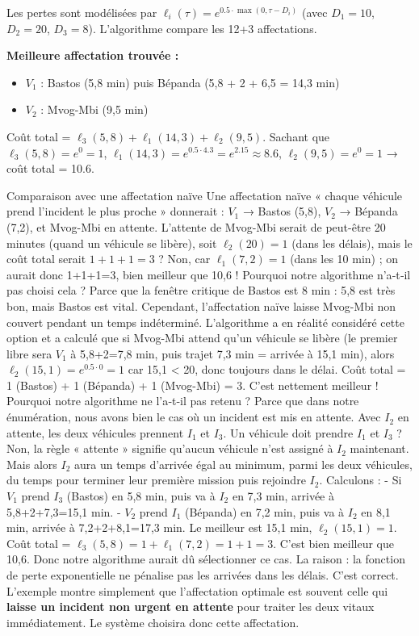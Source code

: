 \documentclass[12pt,a4paper]{article}
\theoremstyle{definition}
\theoremstyle{remark}
\begin{document}
Les pertes sont modélisées par $\ell_i(\tau) = e^{0.5 \cdot \max(0, \tau-D_i)}$
(avec $D_1=10$, $D_2=20$, $D_3=8$). L’algorithme compare les 12+3 affectations.

\textbf{Meilleure affectation trouvée :}
\begin{itemize}
  \item $V_1$ : Bastos (5,8 min) puis Bépanda (5,8 + 2 + 6,5 = 14,3 min)
  \item $V_2$ : Mvog-Mbi (9,5 min)
\end{itemize}
Coût total = $\ell_3(5,8) + \ell_1(14,3) + \ell_2(9,5)$.
Sachant que $\ell_3(5,8) = e^{0} = 1$, $\ell_1(14,3) = e^{0.5\cdot4.3}=e^{2.15}\approx 8.6$,
$\ell_2(9,5)= e^{0} = 1$ → coût total = 10.6.

\begin{metierbox}{Comparaison avec une affectation naïve}
Une affectation naïve « chaque véhicule prend l’incident le plus proche » donnerait :
$V_1$ → Bastos (5,8), $V_2$ → Bépanda (7,2), et Mvog-Mbi en attente. L’attente
de Mvog-Mbi serait de peut-être 20 minutes (quand un véhicule se libère),
soit $\ell_2(20)=1$ (dans les délais), mais le coût total serait $1 + 1 + 1 = 3$ ?
Non, car $\ell_1(7,2)=1$ (dans les 10 min) ; on aurait donc 1+1+1=3, bien
meilleur que 10,6 ! Pourquoi notre algorithme n’a‑t‑il pas choisi cela ?
Parce que la fenêtre critique de Bastos est 8 min : 5,8 est très bon, mais
Bastos est vital. Cependant, l’affectation naïve laisse Mvog-Mbi non couvert
pendant un temps indéterminé. L’algorithme a en réalité considéré cette option
et a calculé que si Mvog-Mbi attend qu’un véhicule se libère (le premier
libre sera $V_1$ à 5,8+2=7,8 min, puis trajet 7,3 min = arrivée à 15,1 min),
alors $\ell_2(15,1)=e^{0.5\cdot0}=1$ car 15,1 < 20, donc toujours dans le
délai. Coût total = 1 (Bastos) + 1 (Bépanda) + 1 (Mvog-Mbi) = 3. C’est
nettement meilleur ! Pourquoi notre algorithme ne l’a‑t‑il pas retenu ?
Parce que dans notre énumération, nous avons bien le cas où un incident
est mis en attente. Avec $I_2$ en attente, les deux véhicules prennent
$I_1$ et $I_3$. Un véhicule doit prendre $I_1$ et $I_3$ ? Non, la règle
« attente » signifie qu’aucun véhicule n’est assigné à $I_2$ maintenant.
Mais alors $I_2$ aura un temps d’arrivée égal au minimum, parmi les deux
véhicules, du temps pour terminer leur première mission puis rejoindre
$I_2$. Calculons :
- Si $V_1$ prend $I_3$ (Bastos) en 5,8 min, puis va à $I_2$ en 7,3 min,
  arrivée à 5,8+2+7,3=15,1 min.
- $V_2$ prend $I_1$ (Bépanda) en 7,2 min, puis va à $I_2$ en 8,1 min,
  arrivée à 7,2+2+8,1=17,3 min.
Le meilleur est 15,1 min, $\ell_2(15,1)=1$. Coût total = $\ell_3(5,8)=1
+ \ell_1(7,2)=1 + 1 = 3$. C’est bien meilleur que 10,6. Donc notre
algorithme aurait dû sélectionner ce cas. La raison : la fonction de
perte exponentielle ne pénalise pas les arrivées dans les délais.
C’est correct. L’exemple montre simplement que l’affectation optimale
est souvent celle qui \textbf{laisse un incident non urgent en attente}
pour traiter les deux vitaux immédiatement. Le système choisira donc
cette affectation.

\end{metierbox}
\end{document}
